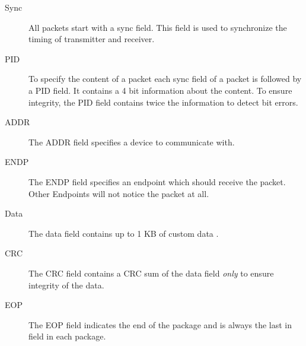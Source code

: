 \documentclass{acm_proc_article-sp}
\begin{document}
\begin{description}
\item[Sync]
All packets start with a sync field.
This field is used to synchronize the timing of transmitter and receiver.

\item[PID]
To specify the content of a packet each sync field of a packet is followed by a PID field.
It contains a 4 bit information about the content.
To ensure integrity, the PID field contains twice the information to detect bit errors.

\item[ADDR]
The ADDR field specifies a device to communicate with.

\item[ENDP]
The ENDP field specifies an endpoint which should receive the packet.
Other Endpoints will not notice the packet at all.

\item[Data]
The data field contains up to 1 KB of custom data \cite{beyond}.

\item [CRC]
The CRC field contains a CRC sum of the data field \emph{only} to ensure integrity of the data.

\item[EOP]
The EOP field indicates the end of the package and is always the last in field in each package.

\end{description}
\end{document}
